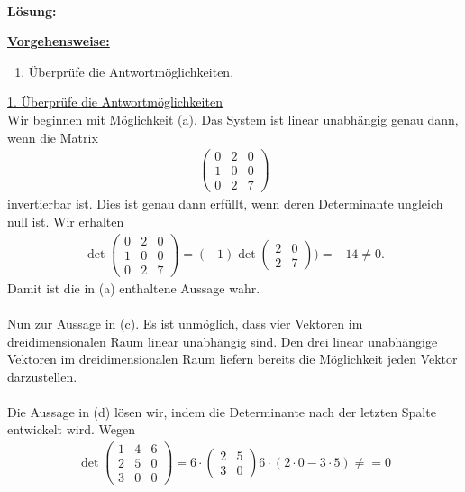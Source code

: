 \ \\
\textbf{Lösung:}
\begin{mdframed}
	\underline{\textbf{Vorgehensweise:}}
	\renewcommand{\labelenumi}{\theenumi.}
	\begin{enumerate}
		\item Überprüfe die Antwortmöglichkeiten.
	\end{enumerate}
\end{mdframed}

\underline{1. Überprüfe die Antwortmöglichkeiten}\\
Wir beginnen mit Möglichkeit (a).
Das System ist linear unabhängig genau dann, wenn die Matrix
\begin{align*}
\begin{pmatrix}
0 & 2 & 0\\
1 & 0 & 0 \\
0 & 2 & 7
\end{pmatrix}
\end{align*}
invertierbar ist. Dies ist genau dann erfüllt, wenn deren Determinante ungleich null ist. Wir erhalten
\begin{align*}
\det 
\begin{pmatrix}
0 & 2 & 0\\
1 & 0 & 0 \\
0 & 2 & 7
\end{pmatrix}
= 
(-1) \det 
\begin{pmatrix}
2 & 0 \\
2 & 7 
\end{pmatrix} ) = - 14 \neq 0.
\end{align*}
Damit ist die in (a) enthaltene Aussage wahr.\\ 
\\
Nun zur Aussage in (c).
Es ist unmöglich, dass vier Vektoren im dreidimensionalen Raum linear unabhängig sind.
Den drei linear unabhängige Vektoren im dreidimensionalen Raum liefern bereits die Möglichkeit jeden Vektor darzustellen.\\
\\
Die Aussage in (d) lösen wir, indem die Determinante nach der letzten Spalte entwickelt wird.
Wegen 
\begin{align*}
\det 
\begin{pmatrix}
1 & 4 & 6 \\
2 & 5 & 0\\
3 & 0 & 0
\end{pmatrix}
= 
6 \cdot 
\begin{pmatrix}
2 & 5 \\
3 & 0
\end{pmatrix}
6 \cdot( 2 \cdot 0 - 3 \cdot 5) \neq = 0
\end{align*}
